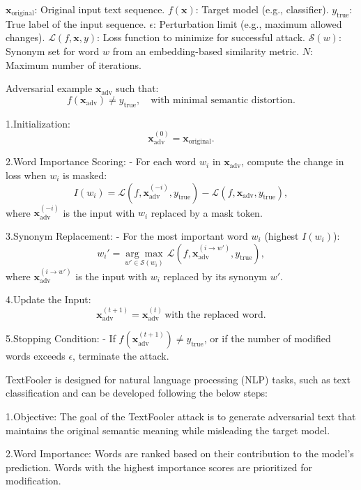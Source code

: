 $\mathbf{x}_{\text{original}}$: Original input text sequence.
$f(\mathbf{x})$: Target model (e.g., classifier).
$y_{\text{true}}$: True label of the input sequence.
$\epsilon$: Perturbation limit (e.g., maximum allowed changes).
$\mathcal{L}(f, \mathbf{x}, y)$: Loss function to minimize for successful attack.
$\mathcal{S}(w)$: Synonym set for word $w$ from an embedding-based similarity metric.
$N$: Maximum number of iterations.

Adversarial example $\mathbf{x}_{\text{adv}}$ such that:
  \[
  f(\mathbf{x}_{\text{adv}}) \neq y_{\text{true}}, \quad \text{with minimal semantic distortion}.
  \]

1.Initialization:
   \[
   \mathbf{x}_{\text{adv}}^{(0)} = \mathbf{x}_{\text{original}}.
   \]

2.Word Importance Scoring:
   - For each word $w_i$ in $\mathbf{x}_{\text{adv}}$, compute the change in loss when $w_i$ is masked:
     \[
     I(w_i) = \mathcal{L}(f, \mathbf{x}_{\text{adv}}^{(-i)}, y_{\text{true}}) - \mathcal{L}(f, \mathbf{x}_{\text{adv}}, y_{\text{true}}),
     \]
     where $\mathbf{x}_{\text{adv}}^{(-i)}$ is the input with $w_i$ replaced by a mask token.

3.Synonym Replacement:
   - For the most important word $w_i$ (highest $I(w_i)$):
     \[
     w_i' = \underset{w' \in \mathcal{S}(w_i)}{\arg \max} \, \mathcal{L}(f, \mathbf{x}_{\text{adv}}^{(i \rightarrow w')}, y_{\text{true}}),
     \]
     where $\mathbf{x}_{\text{adv}}^{(i \rightarrow w')}$ is the input with $w_i$ replaced by its synonym $w'$.

4.Update the Input:
   \[
   \mathbf{x}_{\text{adv}}^{(t+1)} = \mathbf{x}_{\text{adv}}^{(t)} \, \text{with the replaced word}.
   \]

5.Stopping Condition:
   - If $f(\mathbf{x}_{\text{adv}}^{(t+1)}) \neq y_{\text{true}}$, or if the number of modified words exceeds $\epsilon$, terminate the attack.

TextFooler is designed for natural language processing (NLP) tasks, such as text classification and can be developed following the below steps:

1.Objective: The goal of the TextFooler attack is to generate adversarial text that maintains the original semantic meaning while misleading the target model.

2.Word Importance: Words are ranked based on their contribution to the model's prediction. Words with the highest importance scores are prioritized for modification.

